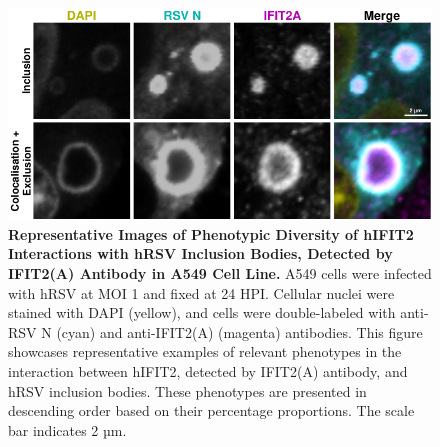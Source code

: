 \begin{figure}
    \centering
    \includegraphics[width=1\linewidth]{08. Chapter 3/Figs/02. Infection/02. IFIT2/01. IFIT2A/03. i2a-a549.pdf}
    \caption[Representative Images of Phenotypic Diversity of hIFIT2 Interactions with hRSV Inclusion Bodies, Detected by IFIT2(A) Antibody in A549 Cell Line.]{\textbf{Representative Images of Phenotypic Diversity of hIFIT2 Interactions with hRSV Inclusion Bodies, Detected by IFIT2(A) Antibody in A549 Cell Line.} A549 cells were infected with hRSV at MOI 1 and fixed at 24 HPI. Cellular nuclei were stained with DAPI (yellow), and cells were double-labeled with anti-RSV N (cyan) and anti-IFIT2(A) (magenta) antibodies. This figure showcases representative examples of relevant phenotypes in the interaction between hIFIT2, detected by IFIT2(A) antibody, and hRSV inclusion bodies. These phenotypes are presented in descending order based on their percentage proportions. The scale bar indicates 2 µm.}
    \label{fig:Representative Images of Phenotypic Diversity of hIFIT2 Interactions with hRSV Inclusion Bodies, Detected by IFIT2(A) Antibody in A549 Cell Line}
\end{figure}

